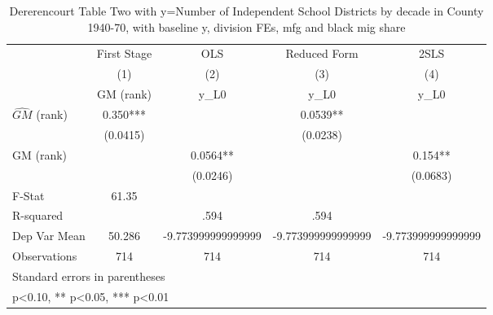 \begin{table}[htbp]\centering
\def\sym#1{\ifmmode^{#1}\else\(^{#1}\)\fi}
\caption{Dererencourt Table Two with y=Number of Independent School Districts by decade in County 1940-70, with baseline y, division FEs, mfg and black mig share}
\begin{tabular}{l*{4}{c}}
\toprule
                    & First Stage   &         OLS   &Reduced Form   &        2SLS   \\
                    &\multicolumn{1}{c}{(1)}&\multicolumn{1}{c}{(2)}&\multicolumn{1}{c}{(3)}&\multicolumn{1}{c}{(4)}\\
                    &\multicolumn{1}{c}{GM  (rank)}&\multicolumn{1}{c}{y\_L0}&\multicolumn{1}{c}{y\_L0}&\multicolumn{1}{c}{y\_L0}\\
\midrule
$\hat{GM}$ (rank)   &       0.350***&               &      0.0539** &               \\
                    &    (0.0415)   &               &    (0.0238)   &               \\
\addlinespace
GM  (rank)          &               &      0.0564** &               &       0.154** \\
                    &               &    (0.0246)   &               &    (0.0683)   \\
\midrule
F-Stat              &       61.35   &               &               &               \\
R-squared           &               &        .594   &        .594   &               \\
Dep Var Mean        &      50.286   &-9.773999999999999   &-9.773999999999999   &-9.773999999999999   \\
Observations        &         714   &         714   &         714   &         714   \\
\bottomrule
\multicolumn{5}{l}{\footnotesize Standard errors in parentheses}\\
\multicolumn{5}{l}{\footnotesize * p<0.10, ** p<0.05, *** p<0.01}\\
\end{tabular}
\end{table}
